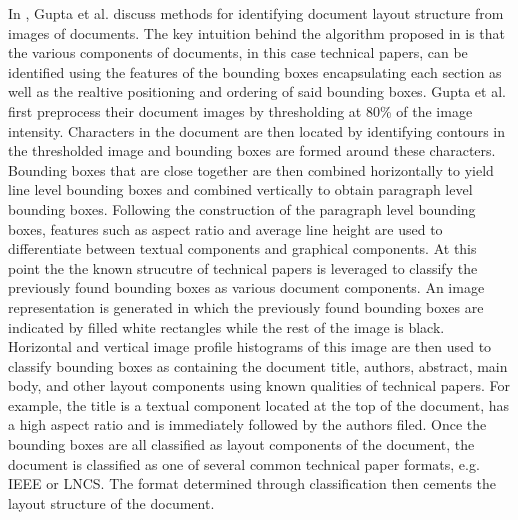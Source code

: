 \documentclass[12pt]{IEEEtran}
\begin{document}
In \cite{3}, Gupta et al. discuss methods for identifying document layout structure from images of documents. The key intuition behind the algorithm proposed in \cite{3} is that the various components of documents, in this case technical papers, can be identified using the features of the bounding boxes encapsulating each section as well as the realtive positioning and ordering of said bounding boxes. Gupta et al. first preprocess their document images by thresholding at 80\% of the image intensity. Characters in the document are then located by identifying contours in the thresholded image and bounding boxes are formed around these characters. Bounding boxes that are close together are then combined horizontally to yield line level bounding boxes and combined vertically to obtain paragraph level bounding boxes. Following the construction of the paragraph level bounding boxes, features such as aspect ratio and average line height are used to differentiate between textual components and graphical components. At this point the the known strucutre of technical papers is leveraged to classify the previously found bounding boxes as various document components. An image representation is generated in which the previously found bounding boxes are indicated by filled white rectangles while the rest of the image is black. Horizontal and vertical image profile histograms of this image are then used to classify bounding boxes as containing the document title, authors, abstract, main body, and other layout components using known qualities of technical papers. For example, the title is a textual component located at the top of the document, has a high aspect ratio and is immediately followed by the authors filed. Once the bounding boxes are all classified as layout components of the document, the document is classified as one of several common technical paper formats, e.g. IEEE or LNCS. The format determined through classification then cements the layout structure of the document.
\end{document}
